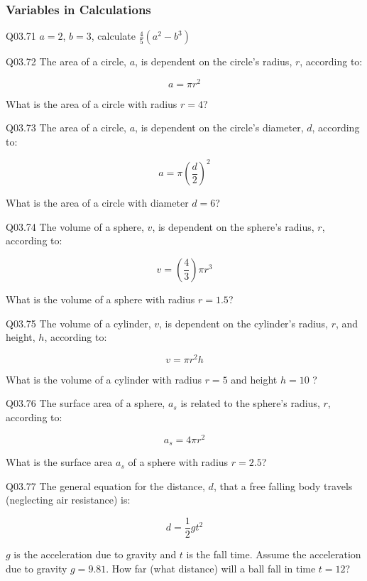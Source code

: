 \documentclass{book}
\newenvironment{problems}{}{}  %
\begin{document}
    




    
        \begin{problems}
        \hypertarget{variables-in-calculations}{%
\subsubsection{Variables in
Calculations}\label{variables-in-calculations}}

Q03.71 \(a = 2\), \(b = 3\), calculate \(\frac{4}{5}(a^2 - b^3)\)

Q03.72 The area of a circle, \(a\), is dependent on the circle's radius,
\(r\), according to:

\[ a=\pi r^2 \]

What is the area of a circle with radius \(r=4\)?

Q03.73 The area of a circle, \(a\), is dependent on the circle's
diameter, \(d\), according to:

\[ a=\pi (\frac{d}{2})^2 \]

What is the area of a circle with diameter \(d=6\)?

Q03.74 The volume of a sphere, \(v\), is dependent on the sphere's
radius, \(r\), according to:

\[ v=(\frac{4}{3})\pi r^3 \]

What is the volume of a sphere with radius \(r=1.5\)?

Q03.75 The volume of a cylinder, \(v\), is dependent on the cylinder's
radius, \(r\), and height, \(h\), according to:

\[ v=\pi r^2 h \]

What is the volume of a cylinder with radius \(r=5\) and height \(h=10\)
?

Q03.76 The surface area of a sphere, \(a_s\) is related to the sphere's
radius, \(r\), according to:

\[ a_s=4\pi r^2 \]

What is the surface area \(a_s\) of a sphere with radius \(r=2.5\)?

Q03.77 The general equation for the distance, \(d\), that a free falling
body travels (neglecting air resistance) is:

\[ d = \frac{1}{2}gt^2 \]

\(g\) is the acceleration due to gravity and \(t\) is the fall time.
Assume the acceleration due to gravity \(g = 9.81\). How far (what
distance) will a ball fall in time \(t = 12\)?


\end{problems}
\end{document}

